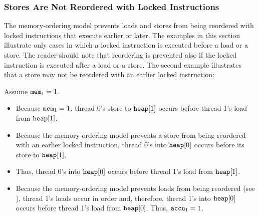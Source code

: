 \newpage

\subsubsection*{Stores Are Not Reordered with Locked Instructions}

The memory-ordering model prevents loads and stores from being reordered with locked instructions that execute earlier or later.
The examples in this section illustrate only cases in which a locked instruction is executed before a load or a store.
The reader should note that reordering is prevented also if the locked instruction is executed after a load or a store.
\bigbreak
\noindent
The second example illustrates that a store may not be reordered with an earlier locked instruction:

\begin{table}[!hbt]
\noindent{}
\caption[Stores Are not Reordered with Locks]{Stores Are not Reordered with Locks \cite[Example 8-10]{ref:Intel}}
\label{tbl:litmus:intel:10}
\end{table}

\noindent
Assume $\texttt{mem}_1 = 1$.
\begin{itemize}
  \item Because $\texttt{mem}_1 = 1$, thread 0’s store to $\texttt{heap}[1]$ occurs before thread 1’s load from $\texttt{heap}[1]$.
  \item Because the memory-ordering model prevents a store from being reordered with an earlier locked instruction, thread 0’s  into $\texttt{heap}[0]$ occurs before its store to $\texttt{heap}[1]$.
  \item Thus, thread 0’s  into $\texttt{heap}[0]$ occurs before thread 1’s load from $\texttt{heap}[1]$.
  \item Because the memory-ordering model prevents loads from being reordered (see \cite[Section 8.2.3.2]{ref:Intel}), thread 1’s loads occur in order and, therefore, thread 1’s  into $\texttt{heap}[0]$ occurs before thread 1’s load from $\texttt{heap}[0]$. Thus, $\texttt{accu}_1 = 1$.
\end{itemize}

